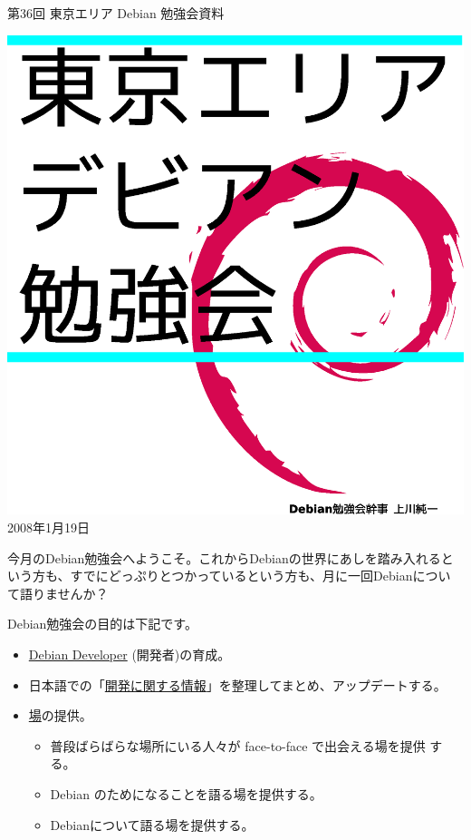 \documentclass[mingoth,a4paper]{jsarticle}
\newcommand{\debmtgyear}{2008}
\newcommand{\debmtgmonth}{1}
\newcommand{\debmtgdate}{19}
\newcommand{\debmtgnumber}{36}
\begin{document}
\begin{titlepage}
\thispagestyle{empty}


\vspace*{-2cm}
第\debmtgnumber{}回 東京エリア Debian 勉強会資料

\hspace*{-2.4cm}
\includegraphics[width=210mm]{image200801/2008title.eps}\\
\hfill{}\debmtgyear{}年\debmtgmonth{}月\debmtgdate{}日

\end{titlepage}

 
 今月のDebian勉強会へようこそ。これからDebianの世界にあしを踏み入れると
 いう方も、すでにどっぷりとつかっているという方も、月に一回Debianについ
 て語りませんか？

 Debian勉強会の目的は下記です。

\begin{itemize}
 \item \underline{Debian Developer} (開発者)の育成。
 \item 日本語での「\underline{開発に関する情報}」を整理してまとめ、アップデートする。
 \item \underline{場}の提供。
 \begin{itemize}
  \item 普段ばらばらな場所にいる人々が face-to-face で出会える場を提供
	する。
  \item Debian のためになることを語る場を提供する。
  \item Debianについて語る場を提供する。
 \end{itemize}
\end{itemize}		
\end{document}
